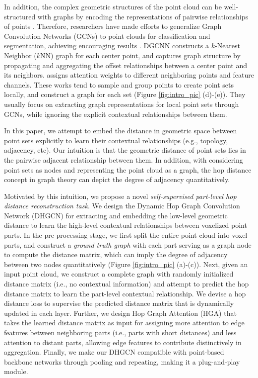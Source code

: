 \documentclass[letterpaper]{article}
\begin{document}
In addition, the complex geometric structures of the point cloud can be well-structured with graphs by encoding the representations of pairwise relationships of points  \cite{defferrard2016convolutional,chung1997spectral}.
Therefore, researchers have made efforts to generalize Graph Convolution Networks (GCNs) to point clouds for classification and segmentation, achieving encouraging results  \cite{qi20173d,landrieu2018large,bi2019graph,yi2023graph}.
DGCNN \cite{dgcnn} constructs a \(k\)-Nearest Neighbor (\(k\)NN) graph for each center point, and
captures graph structure by propagating and aggregating the offset relationships between a center point and its neighbors.
\citet{wang2019graphattenconv} assigns attention weights to different neighboring points and feature channels.
These works tend to sample and group points to create point sets locally, and construct a graph for each set (Figure \ref{fig:intro_pic} (d)-(e)).
They usually focus on extracting graph representations for local point sets through GCNs, while ignoring the explicit contextual relationships between them.


In this paper, we attempt to embed the distance in geometric space between point sets explicitly to learn their contextual relationships (e.g., topology, adjacency, etc).
Our intuition is that the geometric distance of point sets lies in the pairwise adjacent relationship between them.
In addition, with considering point sets as nodes and representing the point cloud as a graph, the hop distance concept in graph theory can depict
the degree of adjacency quantitatively.


Motivated by this intuition, we propose a novel \textit{self-supervised part-level hop distance reconstruction task}.
We design the Dynamic Hop Graph Convolution Network (DHGCN) for extracting and embedding the low-level geometric distance to learn the high-level contextual relationships between voxelized point parts.
In the pre-processing stage, we first split the entire point cloud into voxel parts, and construct a \textit{ground truth graph} with each part serving as a graph node to compute the distance matrix, which can imply the degree of adjacency between two nodes quantitatively (Figure \ref{fig:intro_pic} (a)-(c)).
Next, given an input point cloud, we construct a complete graph with randomly initialized distance matrix (i.e., no contextual information)
and attempt to predict the hop distance matrix to learn the part-level contextual relationship.
We devise a hop distance loss to supervise the predicted distance matrix that is dynamically updated in each layer.
Further, we design Hop Graph Attention (HGA) that takes the learned distance matrix as input for assigning more attention to edge features between neighboring parts (i.e., parts with short distances) and less attention to distant parts,  allowing edge features to contribute distinctively in aggregation.
Finally, we make our DHGCN compatible with point-based backbone networks through pooling and repeating, making it a plug-and-play module.
\end{document}

